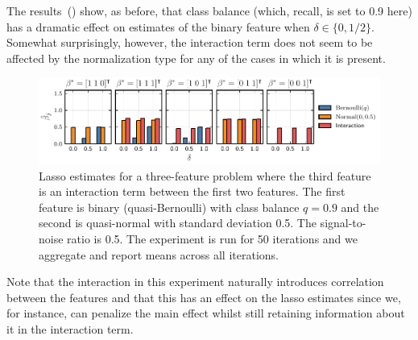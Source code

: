 The results~() show, as before, that class balance (which, recall, is set to 0.9 here) has a dramatic effect on estimates of the binary feature when \(\delta \in \{0, 1/2\}\). Somewhat surprisingly, however, the interaction term does not seem to be affected by the normalization type for any of the cases in which it is present.

\begin{figure}[htpb]
  \label{fig:interactions}
  \centering
  \includegraphics[]{plots/interactions.pdf}
  \caption{%
    Lasso estimates for a three-feature problem where the third feature is an interaction term between the first two features. The first feature is binary (quasi-Bernoulli) with class balance \(q=0.9\) and the second is quasi-normal with standard deviation 0.5. The signal-to-noise ratio is 0.5. The experiment is run for 50 iterations and we aggregate and report means across all iterations.
  }
\end{figure}

Note that the interaction in this experiment naturally introduces correlation between the features and that this has an effect on the lasso estimates since we, for instance, can penalize the main effect whilst still retaining information about it in the interaction term.


